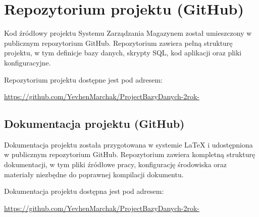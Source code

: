 \chapter{Repozytorium projektu (GitHub)}

Kod źródłowy projektu Systemu Zarządzania Magazynem został umieszczony
w publicznym repozytorium GitHub. Repozytorium zawiera pełną strukturę
projektu, w tym definicje bazy danych, skrypty SQL, kod aplikacji oraz
pliki konfiguracyjne.

Repozytorium projektu dostępne jest pod adresem:
\begin{center}
\url{https://github.com/YevhenMarchak/ProjectBazyDanych-2rok-}
\end{center}

\section{Dokumentacja projektu (GitHub)}

Dokumentacja projektu została przygotowana w systemie \LaTeX{} i
udostępniona w publicznym repozytorium GitHub. Repozytorium zawiera
kompletną strukturę dokumentacji, w tym pliki źródłowe pracy,
konfigurację środowiska oraz materiały niezbędne do poprawnej
kompilacji dokumentu.

Dokumentacja projektu dostępna jest pod adresem:
\begin{center}
\url{https://github.com/YevhenMarchak/ProjectBazyDanych-2rok-}
\end{center}
